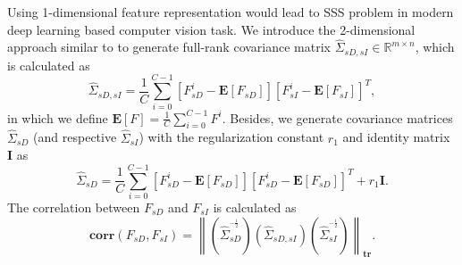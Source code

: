\documentclass{article}
\begin{document}
Using 1-dimensional feature representation would lead to SSS problem in modern deep learning based computer vision task. We introduce the 2-dimensional approach similar to \cite{yang2004two} to generate full-rank covariance matrix $ \hat{\Sigma}_{sD,sI} \in \mathit{\mathbb{R}^{m\times n}}$, which is calculated as
\begin{equation}
    \hat{\Sigma}_{sD,sI} = \frac{1}{\mathit{C}}\sum_{\mathit{i}=0}^{C-1}\left [\mathit{F_{sD}^{i}}-\mathbf{E}\left [{F_{sD}} \right]\right]\left [\mathit{F_{sI}^{i}}-\mathbf{E}\left [{F_{sI}} \right]\right]^{T},
\end{equation}
in which we define $\mathbf{E}\left [{F} \right] = \frac{1}{\mathit{C}}\sum_{\mathit{i}=0}^{C-1}\mathit{F^{i}}$. Besides, we generate covariance matrices $ \hat{\Sigma}_{sD}$ (and respective $\hat{\Sigma}_{sI}$) with the regularization constant $\mathit{r_{1}}$ and identity matrix $\mathbf{I}$ as
\begin{equation}
    \hat{\Sigma}_{sD} = \frac{1}{\mathit{C}}\sum_{\mathit{i}=0}^{C-1}\left [\mathit{F_{sD}^{i}}-\mathbf{E}\left [{F_{sD}} \right]\right]\left [\mathit{F_{sD}^{i}}-\mathbf{E}\left [{F_{sD}} \right]\right]^{T} + \mathit{r_{1}}\mathbf{I}.
\end{equation}
The correlation between $\mathit{F_{sD}}$ and $\mathit{F_{sI}}$ is calculated as
\begin{equation}
     \mathbf{corr(\mathit{{F}_{sD}},\mathit{{F}_{sI}})} =\left \|  ({\hat{\Sigma}_{sD}^{^{-\frac{1}{2}}}}) (\hat{\Sigma}_{sD,sI}) (\hat{\Sigma}_{sI}^{^{-\frac{1}{2}}})  \right \|  _{\mathbf{tr}}.
\end{equation}
\end{document}
